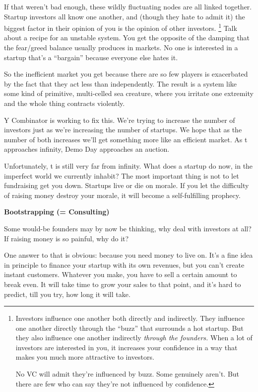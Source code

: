 If that weren't bad enough, these wildly fluctuating nodes are all
linked together. Startup investors all know one another, and (though
they hate to admit it) the biggest factor in their opinion of you is the
opinion of other investors. \footnote{Investors influence one another both directly and indirectly.
They influence one another directly through the ``buzz'' that surrounds
a hot startup. But they also influence one another indirectly
\emph{through the founders.} When a lot of investors are interested in
you, it increases your confidence in a way that makes you much more
attractive to investors.

No VC will admit they're influenced by buzz. Some genuinely aren't. But
there are few who can say they're not influenced by confidence.} Talk about a recipe
for an unstable system. You get the opposite of the damping that the
fear/greed balance usually produces in markets. No one is interested in
a startup that's a ``bargain'' because everyone else hates it.

So the inefficient market you get because there are so few players is
exacerbated by the fact that they act less than independently. The
result is a system like some kind of primitive, multi-celled sea
creature, where you irritate one extremity and the whole thing contracts
violently.

Y Combinator is working to fix this. We're trying to increase the number
of investors just as we're increasing the number of startups. We hope
that as the number of both increases we'll get something more like an
efficient market. As t approaches infinity, Demo Day approaches an
auction.

Unfortunately, t is still very far from infinity. What does a startup do
now, in the imperfect world we currently inhabit? The most important
thing is not to let fundraising get you down. Startups live or die on
morale. If you let the difficulty of raising money destroy your morale,
it will become a self-fulfilling prophecy.

\textbf{Bootstrapping (= Consulting)}

Some would-be founders may by now be thinking, why deal with investors
at all? If raising money is so painful, why do it?

One answer to that is obvious: because you need money to live on. It's a
fine idea in principle to finance your startup with its own revenues,
but you can't create instant customers. Whatever you make, you have to
sell a certain amount to break even. It will take time to grow your
sales to that point, and it's hard to predict, till you try, how long it
will take.

